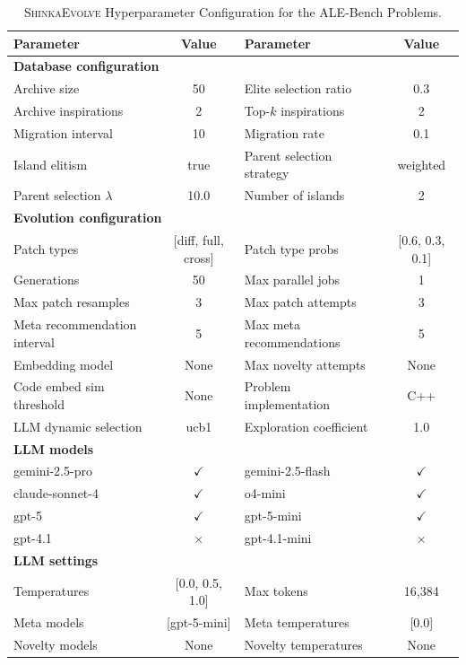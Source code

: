 \documentclass[11pt, a4paper]{include/gdm_format}
\newcommand{\ouralgo}{\textsc{ShinkaEvolve}\xspace}
\begin{document}
{\begin{table}[h]
\centering
\small
\begin{tabular}{lclc}
\toprule
\textbf{Parameter} & \textbf{Value} & \textbf{Parameter} & \textbf{Value} \\
\midrule
\multicolumn{4}{l}{\textbf{Database configuration}} \\
\midrule
Archive size & 50 & Elite selection ratio & 0.3 \\
Archive inspirations & 2 & Top-$k$ inspirations & 2 \\
Migration interval & 10 & Migration rate & 0.1 \\
Island elitism & true & Parent selection strategy & weighted \\
Parent selection $\lambda$ & 10.0 & Number of islands & 2 \\
\midrule
\multicolumn{4}{l}{\textbf{Evolution configuration}} \\
\midrule
Patch types & [diff, full, cross] & Patch type probs & [0.6, 0.3, 0.1] \\
Generations & 50 & Max parallel jobs & 1 \\
Max patch resamples & 3 & Max patch attempts & 3 \\
Meta recommendation interval & 5 & Max meta recommendations & 5 \\
Embedding model & None & Max novelty attempts & None \\
Code embed sim threshold & None & Problem implementation & C++ \\
LLM dynamic selection & ucb1 & Exploration coefficient & 1.0 \\
\midrule
\multicolumn{4}{l}{\textbf{LLM models}} \\
\midrule
gemini-2.5-pro & $\checkmark$ & gemini-2.5-flash & $\checkmark$ \\
claude-sonnet-4 & $\checkmark$ & o4-mini & $\checkmark$ \\
gpt-5 & $\checkmark$ & gpt-5-mini & $\checkmark$ \\
gpt-4.1 & $\times$ & gpt-4.1-mini & $\times$ \\
\midrule
\multicolumn{4}{l}{\textbf{LLM settings}} \\
\midrule
Temperatures & [0.0, 0.5, 1.0] & Max tokens & 16{,}384 \\
Meta models & [gpt-5-mini] & Meta temperatures & [0.0] \\
Novelty models & None & Novelty temperatures & None \\
\bottomrule
\end{tabular}
  \caption{\ouralgo Hyperparameter Configuration for the ALE-Bench Problems.}
  \label{tab:hyperparams_ale}
\end{table}

}
\end{document}
